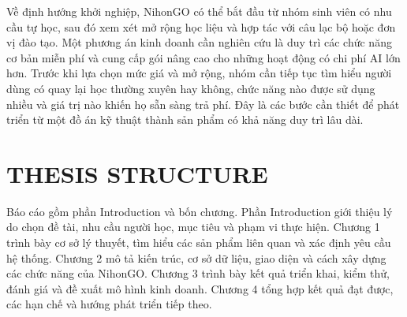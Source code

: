 Về định hướng khởi nghiệp, NihonGO có thể bắt đầu từ nhóm sinh viên có nhu cầu tự học, sau đó xem xét mở rộng học liệu và hợp tác với câu lạc bộ hoặc đơn vị đào tạo. Một phương án kinh doanh cần nghiên cứu là duy trì các chức năng cơ bản miễn phí và cung cấp gói nâng cao cho những hoạt động có chi phí AI lớn hơn. Trước khi lựa chọn mức giá và mở rộng, nhóm cần tiếp tục tìm hiểu người dùng có quay lại học thường xuyên hay không, chức năng nào được sử dụng nhiều và giá trị nào khiến họ sẵn sàng trả phí. Đây là các bước cần thiết để phát triển từ một đồ án kỹ thuật thành sản phẩm có khả năng duy trì lâu dài.

\section{THESIS STRUCTURE}

Báo cáo gồm phần Introduction và bốn chương. Phần Introduction giới thiệu lý do chọn đề tài, nhu cầu người học, mục tiêu và phạm vi thực hiện. Chương 1 trình bày cơ sở lý thuyết, tìm hiểu các sản phẩm liên quan và xác định yêu cầu hệ thống. Chương 2 mô tả kiến trúc, cơ sở dữ liệu, giao diện và cách xây dựng các chức năng của NihonGO. Chương 3 trình bày kết quả triển khai, kiểm thử, đánh giá và đề xuất mô hình kinh doanh. Chương 4 tổng hợp kết quả đạt được, các hạn chế và hướng phát triển tiếp theo.
